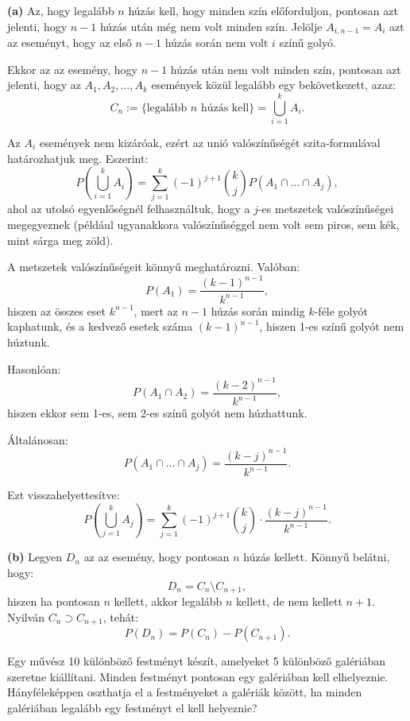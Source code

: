 \begin{solution}
\textbf{(a)} Az, hogy legalább $n$ húzás kell, hogy minden szín előforduljon,
pontosan azt jelenti, hogy $n-1$ húzás után még nem volt minden szín.
Jelölje $A_{i,n-1}=A_{i}$ azt az eseményt, hogy az első $n-1$ húzás
során nem volt $i$ színű golyó.

Ekkor az az esemény, hogy $n-1$ húzás után nem volt minden szín,
pontosan azt jelenti, hogy az $A_{1},A_{2},\dots,A_{k}$ események
közül legalább egy bekövetkezett, azaz: 
\[
C_{n}:=\{\text{legalább }n\text{ húzás kell}\}=\bigcup_{i=1}^{k}A_{i}.
\]

Az $A_{i}$ események nem kizáróak, ezért az unió valószínűségét szita-formulával
határozhatjuk meg. Eszerint: 
\[
P\left(\bigcup_{i=1}^{k}A_{i}\right)=\sum_{j=1}^{k}(-1)^{j+1}\binom{k}{j}P(A_{1}\cap\dots\cap A_{j}),
\]
ahol az utolsó egyenlőségnél felhasználtuk, hogy a $j$-es metszetek
valószínűségei megegyeznek (például ugyanakkora valószínűséggel nem
volt sem piros, sem kék, mint sárga meg zöld).

A metszetek valószínűségeit könnyű meghatározni. Valóban: 
\[
P(A_{1})=\frac{(k-1)^{n-1}}{k^{n-1}},
\]
hiszen az összes eset $k^{n-1}$, mert az $n-1$ húzás során mindig
$k$-féle golyót kaphatunk, és a kedvező esetek száma $(k-1)^{n-1}$,
hiszen 1-es színű golyót nem húztunk.

Hasonlóan: 
\[
P(A_{1}\cap A_{2})=\frac{(k-2)^{n-1}}{k^{n-1}},
\]
hiszen ekkor sem 1-es, sem 2-es színű golyót nem húzhattunk.

Általánosan: 
\[
P(A_{1}\cap\dots\cap A_{j})=\frac{(k-j)^{n-1}}{k^{n-1}}.
\]

Ezt visszahelyettesítve: 
\[
P\left(\bigcup_{j=1}^{k}A_{j}\right)=\sum_{j=1}^{k}(-1)^{j+1}\binom{k}{j}\cdot\frac{(k-j)^{n-1}}{k^{n-1}}.
\]

\textbf{(b)} Legyen $D_{n}$ az az esemény, hogy pontosan $n$ húzás
kellett. Könnyű belátni, hogy: 
\[
D_{n}=C_{n}\setminus C_{n+1},
\]
hiszen ha pontosan $n$ kellett, akkor legalább $n$ kellett, de nem
kellett $n+1$. Nyilván $C_{n}\supset C_{n+1}$, tehát: 
\[
P(D_{n})=P(C_{n})-P(C_{n+1}).
\]
\end{solution}
\begin{extraproblem}
Egy művész 10 különböző festményt készít, amelyeket 5 különböző galériában
szeretne kiállítani. Minden festményt pontosan egy galériában kell
elhelyeznie. Hányféleképpen oszthatja el a festményeket a galériák
között, ha minden galériában legalább egy festményt el kell helyeznie? 
\end{extraproblem}

